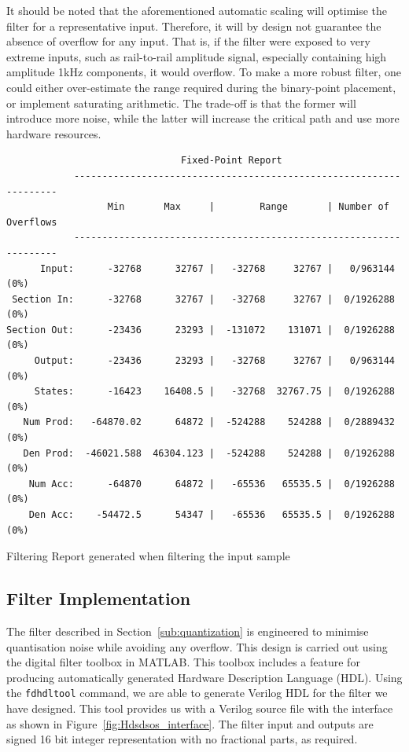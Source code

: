 \documentclass[]{article}
\begin{document}
It should be noted that the aforementioned automatic scaling will optimise the filter for a representative input. Therefore, it will by design not guarantee the absence of overflow for any input. That is, if the filter were exposed to very extreme inputs, such as rail-to-rail amplitude signal, especially containing high amplitude 1kHz components, it would overflow.
To make a more robust filter, one could either over-estimate the range required during the binary-point placement, or implement saturating arithmetic. The trade-off is that the former will introduce more noise, while the latter will increase the critical path and use more hardware resources.

\begin{table}[tbp]
	\begin{center}
		\begin{lstlisting}
                               Fixed-Point Report                                          
            -------------------------------------------------------------------
                  Min       Max     |        Range       | Number of Overflows
            -------------------------------------------------------------------
      Input:      -32768      32767 |   -32768     32767 |   0/963144 (0%)
 Section In:      -32768      32767 |   -32768     32767 |  0/1926288 (0%)
Section Out:      -23436      23293 |  -131072    131071 |  0/1926288 (0%)
     Output:      -23436      23293 |   -32768     32767 |   0/963144 (0%)
     States:      -16423    16408.5 |   -32768  32767.75 |  0/1926288 (0%)
   Num Prod:   -64870.02      64872 |  -524288    524288 |  0/2889432 (0%)
   Den Prod:  -46021.588  46304.123 |  -524288    524288 |  0/1926288 (0%)
    Num Acc:      -64870      64872 |   -65536   65535.5 |  0/1926288 (0%)
    Den Acc:    -54472.5      54347 |   -65536   65535.5 |  0/1926288 (0%)
		\end{lstlisting}
	\end{center}
	\caption{Filtering Report generated when filtering the input sample}
	\label{tab:fixedpoint_report}
\end{table}



\subsection{Filter Implementation} %
\label{sub:filter_implementation}

The filter described in Section~\ref{sub:quantization} is engineered to minimise quantisation noise while avoiding any overflow. This design is carried out using the digital filter toolbox in MATLAB.
This toolbox includes a feature for producing automatically generated Hardware Description Language (HDL).
Using the \verb"fdhdltool" command, we are able to generate Verilog HDL for the filter we have designed.
This tool provides us with a Verilog source file with the interface as shown in Figure~\ref{fig:Hdsdsos_interface}. The filter input and outputs are signed 16 bit integer representation with no fractional parts, as required.
\end{document}
